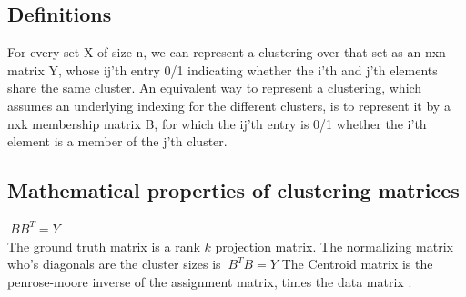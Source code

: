 \subsection{Definitions}
For every set X of size n, we can represent a clustering over that set as an nxn matrix Y, whose ij'th entry 0/1 indicating whether the i'th and j'th elements share the same cluster.
  An equivalent way to represent a clustering, which assumes an underlying indexing for the different clusters, is to represent it by a nxk membership matrix B, for which the ij'th entry is 0/1 whether the i'th element is a member of the j'th cluster.\\
 \subsection{Mathematical properties of clustering matrices}
 $\ B B^T=Y$\\
 The ground truth matrix is a rank $k$ projection matrix.
 The normalizing matrix who's diagonals are the cluster sizes is $\ B^T B=Y$
 The Centroid matrix is the penrose-moore inverse of the assignment matrix, times the data matrix \cite{banarjee05}.\\ 
\fi